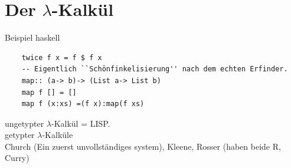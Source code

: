 \documentclass{article}
\theoremstyle{definition}
\begin{document}
	\section{Der $\lambda$-Kalkül}
	Beispiel haskell
	\begin{framed}
	\begin{verbatim}
	twice f x = f $ f x
	-- Eigentlich ``Schönfinkelisierung'' nach dem echten Erfinder.
	map:: (a-> b)-> (List a-> List b) 
	map f [] = []
	map f (x:xs) =(f x):map(f xs)
	\end{verbatim}
	\end{framed}\noindent
	ungetypter $\lambda$-Kalkül = LISP.\\
	getypter $\lambda$-Kalküle\\
	Church (Ein zuerst unvollständiges system), Kleene, Rosser (haben beide R, Curry)\\
\end{document}
